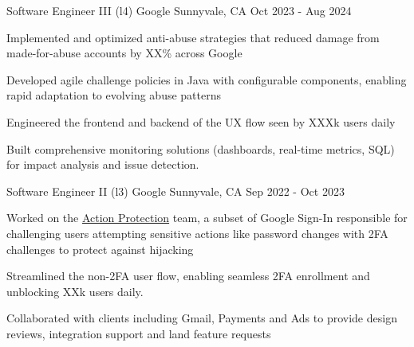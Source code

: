 
\hypersetup{
    colorlinks=true,
    linkcolor=blue,
    filecolor=magenta,
    urlcolor=awesome,
}



\begin{cventries}

  \cventry
	{Software Engineer III (l4)}
    {Google}
    {Sunnyvale, CA}
    {Oct 2023 - Aug 2024}
    {
      \begin{cvitems}
		\item Implemented and optimized anti-abuse strategies that reduced damage from made-for-abuse accounts by XX\% across Google
		\item Developed agile challenge policies in Java with configurable components, enabling rapid adaptation to evolving abuse patterns
		\item Engineered the frontend and backend of the UX flow seen by XXXk users daily
		\item Built comprehensive monitoring solutions (dashboards, real-time metrics, SQL) for impact analysis and issue detection.
      \end{cvitems}
    }

  \cventry
	{Software Engineer II (l3)}
    {Google}
    {Sunnyvale, CA}
    {Sep 2022 - Oct 2023}
    {
      \begin{cvitems}
	  \item Worked on the \href{https://support.google.com/accounts/answer/7162782}{Action Protection} team, a subset of Google Sign-In responsible for challenging users attempting sensitive actions like password changes with 2FA challenges to protect against hijacking
	  \item Streamlined the non-2FA user flow, enabling seamless 2FA enrollment and unblocking XXk users daily.
	  \item Collaborated with clients including Gmail, Payments and Ads to provide design reviews, integration support and land feature requests
      \end{cvitems}
    }


\end{cventries}
